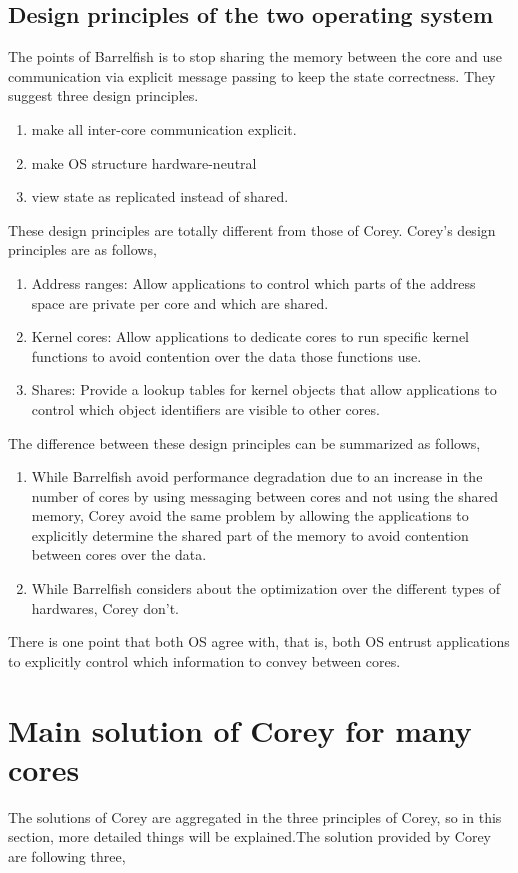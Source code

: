 \documentclass[10pt,a4paper]{ltjsarticle}       %
\begin{document}
\subsection{Design principles of the two operating system}
The points of Barrelfish is to stop sharing the memory between the core and use communication via explicit message passing to keep the state correctness. They suggest three design principles.
\begin{enumerate}
  \item make all inter-core communication explicit.
  \item make OS structure hardware-neutral
  \item view state as replicated instead of shared.
\end{enumerate}
These design principles are totally different from those of Corey. Corey's design principles are as follows,
\begin{enumerate}
  \item Address ranges:  Allow applications to control which parts of the address space are private per core and which are shared.
  \item Kernel cores:  Allow applications to dedicate cores to run specific kernel functions to avoid contention over the data those functions use.
  \item Shares:  Provide a lookup tables for kernel objects that allow applications to control which object identifiers are visible to other cores.
\end{enumerate}
The difference between these design principles can be summarized as follows,
\begin{enumerate}
  \item While Barrelfish avoid performance degradation due to an increase in the number of cores by using messaging between cores and not using the shared memory, Corey avoid the same problem by allowing the applications to explicitly determine the shared part of the memory to avoid contention between cores over the data.
  \item While Barrelfish considers about the optimization over the different types of hardwares, Corey don't.
\end{enumerate}
There is one point that both OS agree with, that is, both OS entrust applications to explicitly control which information to convey between cores.
\section{Main solution of Corey for many cores}
The solutions of Corey are aggregated in the three principles of Corey, so in this section, more detailed things will be explained.The solution provided by Corey are following three,
\end{document}

